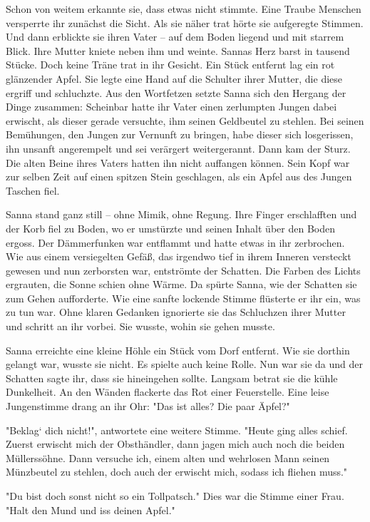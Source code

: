 \documentclass[10pt, a4paper, oneside]{book}
\begin{document}
\begin{multicols}{2}
Schon von weitem erkannte sie, dass etwas nicht stimmte. Eine Traube Menschen versperrte ihr zunächst die Sicht. Als sie näher trat hörte sie aufgeregte Stimmen. Und dann erblickte sie ihren Vater – auf dem Boden liegend und mit starrem Blick. Ihre Mutter kniete neben ihm und weinte. Sannas Herz barst in tausend Stücke. Doch keine Träne trat in ihr Gesicht. Ein Stück entfernt lag ein rot glänzender Apfel. Sie legte eine Hand auf die Schulter ihrer Mutter, die diese ergriff und schluchzte. Aus den Wortfetzen setzte Sanna sich den Hergang der Dinge zusammen: Scheinbar hatte ihr Vater einen zerlumpten Jungen dabei erwischt, als dieser gerade versuchte, ihm seinen Geldbeutel zu stehlen. Bei seinen Bemühungen, den Jungen zur Vernunft zu bringen, habe dieser sich losgerissen, ihn unsanft angerempelt und sei verärgert weitergerannt. Dann kam der Sturz. Die alten Beine ihres Vaters hatten ihn nicht auffangen können. Sein Kopf war zur selben Zeit auf einen spitzen Stein geschlagen, als ein Apfel aus des Jungen Taschen fiel.\bigskip

Sanna stand ganz still – ohne Mimik, ohne Regung. Ihre Finger erschlafften und der Korb fiel zu Boden, wo er umstürzte und seinen Inhalt über den Boden ergoss. Der Dämmerfunken war entflammt und hatte etwas in ihr zerbrochen. Wie aus einem versiegelten Gefäß, das irgendwo tief in ihrem Inneren versteckt gewesen und nun zerborsten war, entströmte der Schatten. Die 
Farben des Lichts ergrauten, die Sonne schien ohne Wärme. Da spürte Sanna, wie der Schatten sie zum Gehen aufforderte. Wie eine sanfte lockende Stimme flüsterte er ihr ein, was zu tun war. Ohne klaren Gedanken ignorierte sie das Schluchzen ihrer Mutter und schritt an ihr vorbei. Sie wusste, wohin sie gehen musste.\bigskip

Sanna erreichte eine kleine Höhle ein Stück vom Dorf entfernt. Wie sie dorthin gelangt war, wusste sie nicht. Es spielte auch keine Rolle. Nun war sie da und der Schatten sagte ihr, dass sie hineingehen sollte. Langsam betrat sie die kühle Dunkelheit. An den Wänden flackerte das Rot einer Feuerstelle. Eine leise Jungenstimme drang an ihr Ohr: "Das ist alles? Die paar Äpfel?"\bigskip

"Beklag‘ dich nicht!", antwortete eine weitere Stimme. "Heute ging alles schief. Zuerst erwischt mich der Obsthändler, dann jagen mich auch noch die beiden Müllerssöhne. Dann versuche ich, einem alten und wehrlosen Mann seinen Münzbeutel zu stehlen, doch auch der erwischt mich, sodass ich fliehen muss."\bigskip

"Du bist doch sonst nicht so ein Tollpatsch." Dies war die Stimme einer Frau. "Halt den Mund und iss deinen Apfel."\bigskip


\end{multicols}
\end{document}
